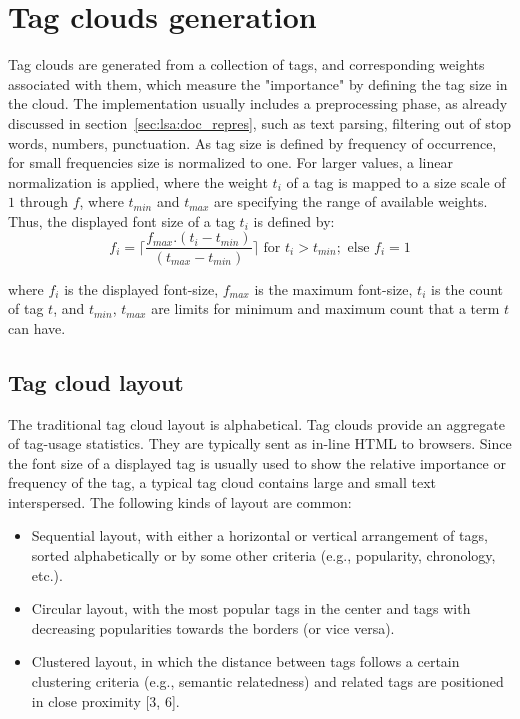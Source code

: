 \section{Tag clouds generation}
Tag clouds are generated from a collection of tags, and corresponding weights associated with them, which measure the "importance" by defining the tag size in the cloud. The implementation usually includes a preprocessing phase, as already discussed in section~\ref{sec:lsa:doc_repres}, such as text parsing, filtering out of stop words, numbers, punctuation. As tag size is defined by frequency of occurrence, for small frequencies size is normalized to one. For larger values, a linear normalization is applied, where the weight $t_{i}$ of a tag is mapped to a size scale of $1$ through $f$, where $t_{min}$ and $t_{max}$ are specifying the range of available weights. Thus, the displayed font size of a tag $t_{i}$ is defined by: \\
\begin{equation}
f_{i} = \lceil {\frac{f_{max} . (t_{i} - t_{min})}{(t_{max} - t_{min})} }\rceil \mbox{ for }  t_{i} > t_{min}; \mbox{ else }  f_{i} = 1
\end{equation}

where $f_{i}$ is the displayed font-size, $f_{max}$ is the maximum font-size, $t_{i}$ is the count of tag $t$, and $t_{min}$, $t_{max}$ are limits for minimum and maximum count that a term $t$ can have. \\

\subsection{Tag cloud layout}
The traditional tag cloud layout is alphabetical. Tag clouds provide an aggregate of tag-usage statistics. They are typically sent as in-line HTML to browsers. Since the font size of a displayed tag is usually used to show the relative importance or frequency of the tag, a typical tag cloud contains large and small text interspersed. The following kinds of layout are common: \\

\begin{itemize}
\item Sequential layout, with either a horizontal or vertical arrangement of tags, sorted
alphabetically or by some other criteria (e.g., popularity, chronology, etc.).

\item Circular layout, with the most popular tags in the center and tags with decreasing
popularities towards the borders (or vice versa).
 
\item Clustered layout, in which the distance between tags follows a certain clustering
criteria (e.g., semantic relatedness) and related tags are positioned in close
proximity [3, 6].
\end{itemize}



